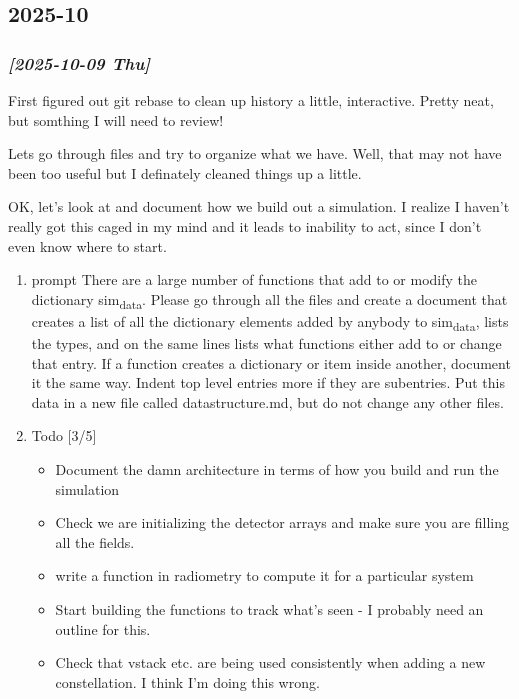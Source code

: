 \documentclass[11pt]{article}
\begin{document}
\subsection{2025-10}
\label{sec:orgb106ff3}

\subsubsection{\textit{[2025-10-09 Thu]}}
\label{sec:orgddd4938}
First figured out git rebase to clean up history a little, interactive.
Pretty neat, but somthing I will need to review!

Lets go through files and try to organize what we have. Well, that may
not have been too useful but I definately cleaned things up a little.


OK, let's look at and document how we build out a simulation.
I realize I haven't really got this caged in my mind and it leads to inability
to act, since I don't even know where to start.

\begin{enumerate}
\item prompt
\label{sec:orgb7d8a04}
There are a large number of functions that add to or modify the dictionary sim\textsubscript{data}.  Please go through all
   the files and create a document that creates a list of all the dictionary elements added by anybody to 
  sim\textsubscript{data}, lists the types, and on the same lines lists what functions either add to or change that entry.  
  If a function creates a dictionary or item inside another, document it the same way.  Indent top level 
  entries more if they are subentries.  Put this data in a new file called datastructure.md, but do not 
  change any other files.

\item Todo  [3/5]
\label{sec:orgda01299}
\begin{itemize}
\item[{$\square$}] Document the damn architecture in terms of how you build and run
the simulation
\item[{$\square$}] Check we are initializing the detector arrays and make sure you are filling
all the fields.
\item[{$\square$}] write a function in radiometry to compute it for a particular system
\item[{$\square$}] Start building the functions to track what's seen - I probably need
an outline for this.
\item[{$\square$}] Check that vstack etc. are being used consistently when adding a new constellation.
I think I'm doing this wrong.
\end{itemize}
\end{enumerate}
\end{document}
